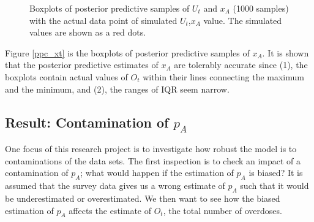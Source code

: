 \documentclass[12pt]{article}
\begin{document}
{\begin{figure}[htb]
	\centering
	\caption[two early result box plots:]{Boxplots of posterior predictive samples of $U_t$ and $x_A$ (1000 samples) with the actual data point of simulated $U_t$,$x_A$ value. The simulated values are shown as a red dots.}
	
\end{figure}

Figure \ref{ppc_xt} is the boxplots of posterior predictive samples of $x_A$. It is shown that the posterior predictive estimates of $x_A$ are tolerably accurate since (1), the boxplots contain actual values of $O_t$ within their lines connecting the maximum and the minimum, and (2), the ranges of IQR seem narrow. \\



\subsection{Result: Contamination of $p_A$ } 
One focus of this research project is to investigate how robust the model is to contaminations of the data sets. The first inspection is to check an impact of a contamination of $p_A$; what would happen if the estimation of $p_A$ is biased? It is assumed that the survey data gives us a wrong estimate of $p_A$ such that it would be underestimated or overestimated. We then want to see how the biased estimation of $p_A$ affects the estimate of $O_t$, the total number of overdoses.\\

}
\end{document}

